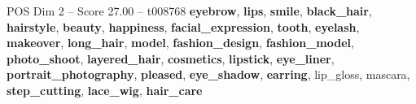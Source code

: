 \begin{textsample}{POS Dim 2 – Score 27.00 – t008768}  \label{ex:f2_pos_007}
\textbf{eyebrow}, \textbf{lips}, \textbf{smile}, \textbf{black\_hair}, \textbf{hairstyle}, \textbf{beauty}, \textbf{happiness}, \textbf{facial\_expression}, \textbf{tooth}, \textbf{eyelash}, \textbf{makeover}, \textbf{long\_hair}, \textbf{model}, \textbf{fashion\_design}, \textbf{fashion\_model}, \textbf{photo\_shoot}, \textbf{layered\_hair}, \textbf{cosmetics}, \textbf{lipstick}, \textbf{eye\_liner}, \textbf{portrait\_photography}, \textbf{pleased}, \textbf{eye\_shadow}, \textbf{earring}, lip\_gloss, mascara, \textbf{step\_cutting}, \textbf{lace\_wig}, \textbf{hair\_care}

\end{textsample}
